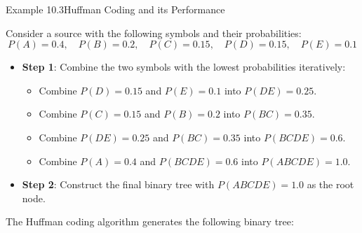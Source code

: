 \documentclass{book}
\begin{document}
\begin{egBox}{Example 10.3}{Huffman Coding and its Performance}
    \raggedright
    Consider a source with the following symbols and their probabilities:
    \[
        P(A) = 0.4, \quad P(B) = 0.2, \quad P(C) = 0.15, \quad P(D) = 0.15, \quad P(E) = 0.1
    \]
    \begin{itemize}
        \item \textbf{Step 1}: Combine the two symbols with the lowest probabilities iteratively:
        \begin{itemize}
            \item Combine $P(D) = 0.15$ and $P(E) = 0.1$ into $P(DE) = 0.25$.
            \item Combine $P(C) = 0.15$ and $P(B) = 0.2$ into $P(BC) = 0.35$.
            \item Combine $P(DE) = 0.25$ and $P(BC) = 0.35$ into $P(BCDE) = 0.6$.
            \item Combine $P(A) = 0.4$ and $P(BCDE) = 0.6$ into $P(ABCDE) = 1.0$.
        \end{itemize}
        \item \textbf{Step 2}: Construct the final binary tree with $P(ABCDE) = 1.0$ as the root node.   \end{itemize}
    The Huffman coding algorithm generates the following binary tree:
    \begin{center}
\end{center}
\end{egBox}
\end{document}
